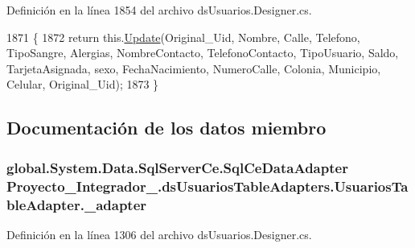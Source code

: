 Definición en la línea 1854 del archivo ds\-Usuarios.\-Designer.\-cs.


\begin{DoxyCode}
1871                                               \{
1872             \textcolor{keywordflow}{return} this.\hyperlink{class_proyecto___integrador__3_1_1ds_usuarios_table_adapters_1_1_usuarios_table_adapter_a0cb310a6346b919a7ac5717ea3225d0b}{Update}(Original\_Uid, Nombre, Calle, Telefono, TipoSangre, Alergias, 
      NombreContacto, TelefonoContacto, TipoUsuario, Saldo, TarjetaAsignada, sexo, FechaNacimiento, NumeroCalle, Colonia, 
      Municipio, Celular, Original\_Uid);
1873         \}
\end{DoxyCode}


\subsection{Documentación de los datos miembro}
\hypertarget{class_proyecto___integrador__3_1_1ds_usuarios_table_adapters_1_1_usuarios_table_adapter_ab48b9b83ce2db01dbbc83ad45b428a80}{
\subsubsection[{\-\_\-adapter}]{\setlength{\rightskip}{0pt plus 5cm}global.\-System.\-Data.\-Sql\-Server\-Ce.\-Sql\-Ce\-Data\-Adapter Proyecto\-\_\-\-Integrador\-\_.\-ds\-Usuarios\-Table\-Adapters.\-Usuarios\-Table\-Adapter.\-\_\-adapter\hspace{0.3cm}{\ttfamily [private]}}}\label{class_proyecto___integrador__3_1_1ds_usuarios_table_adapters_1_1_usuarios_table_adapter_ab48b9b83ce2db01dbbc83ad45b428a80}


Definición en la línea 1306 del archivo ds\-Usuarios.\-Designer.\-cs.

